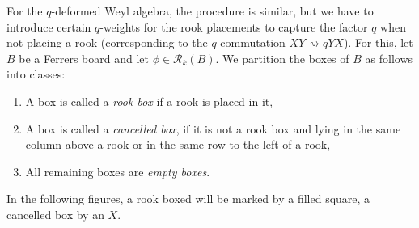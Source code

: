\documentclass[10pt]{amsart}
\begin{document}
For the $q$-deformed Weyl algebra, the procedure is similar, but we have to introduce certain $q$-weights for the rook placements to capture the factor $q$ when not placing a rook (corresponding to the $q$-commutation $XY \rightsquigarrow qYX $). For this, let $B$ be a Ferrers board and let $\phi \in \mathcal{R}_k(B)$. We partition the boxes of $B$ as follows into classes:
\begin{enumerate}
\item A box is called a {\em rook box} if a rook is placed in it,
\item A box is called a {\em cancelled box}, if it is not a rook box and lying in the same column above a rook or in the same row to the left of a rook,
\item All remaining boxes are {\em empty boxes}. 
\end{enumerate} 
In the following figures, a rook boxed will be marked by a filled square, a cancelled box by an $X$. 
\end{document}
